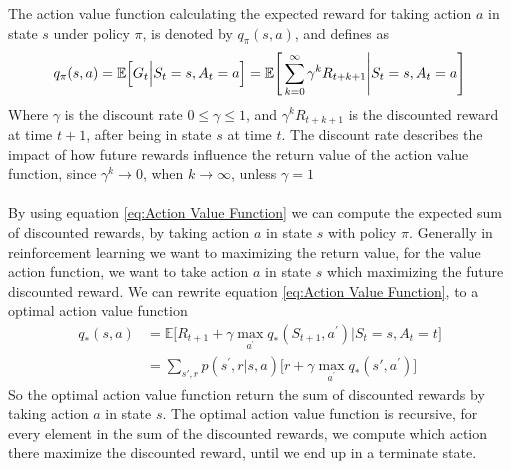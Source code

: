 \documentclass[11pt]{article}
\begin{document}
The action value function calculating the expected reward for taking action $a$ in state $s$ under policy $\pi$, is denoted by $q_{\pi}(s, a)$, and defines as
\\
\begin{equation} \label{eq:Action Value Function}
    q_{\pi}(s, a) = \mathbb{E}\Big[G_{t} \Big| S_{t} = s, A_{t} = a\Big] \\
    = \mathbb{E}\Bigg[\sum_{k = 0}^{\infty}\gamma^{k}R_{t + k + 1} \Bigg| S_{t} = s, A_{t} = a \Bigg]
\end{equation}
Where $\gamma$ is the discount rate $0 \leq \gamma \leq 1$, and
$\gamma^{k}R_{t + k + 1}$ is the discounted reward at time $t + 1$,
after being in state $s$ at time $t$. The discount rate describes the impact of how future rewards influence the return value of the action value function, since $\gamma^{k} \rightarrow 0$, when $k \rightarrow \infty$, unless $\gamma = 1$
\\ \\
By using equation \ref{eq:Action Value Function} we can compute the expected sum of discounted rewards, by taking action $a$ in state $s$ with policy $\pi$. Generally in reinforcement learning we want to maximizing the return value, for the value action function, we want to take action $a$ in state $s$ which maximizing the future discounted reward. We can rewrite equation \ref{eq:Action Value Function}, to a optimal action value function
\begin{equation}
\begin{split}
    q_{*}(s,a) &= \mathbb{E}\Bigg[R_{t + 1} + \gamma  \max\limits_{a^{'}} q_{*}(S_{t + 1}, a^{'}) \Bigg| S_{t} = s, A_{t} = t \Bigg] \\
    &= \sum_{s{'}, r} p(s^{'}, r \Big| s, a) \Big[r + \gamma \max\limits_{a^{'}}q_{*}(s{'}, a^{'})\Big]
\end{split}
\end{equation}
So the optimal action value function return the sum of discounted rewards by taking action $a$ in state $s$. The optimal action value function is recursive, for every element in the sum of the discounted rewards, we compute which action there maximize the discounted reward, until we end up in a terminate state.
\end{document}
